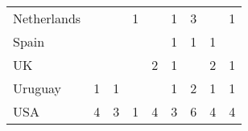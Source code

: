 \begin{table}[ht]
\begin{tabular}{lcccccccc}
  \hspace{2mm}Netherlands &  &  & 1 &  & 1 & 3 &  & 1 \\ 
  \hspace{2mm}Spain &  &  &  &  & 1 & 1 & 1 &  \\ 
  \hspace{2mm}UK &  &  &  & 2 & 1 &  & 2 & 1 \\ 
  \hspace{2mm}Uruguay & 1 & 1 &  &  & 1 & 2 & 1 & 1 \\ 
  \hspace{2mm}USA & 4 & 3 & 1 & 4 & 3 & 6 & 4 & 4 \\ 
   \hline
\end{tabular}
\endgroup
\end{table}
